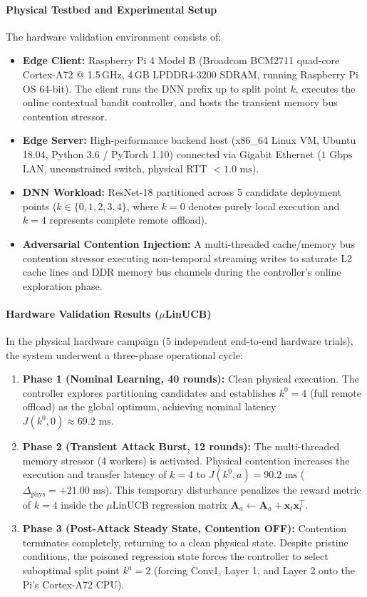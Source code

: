 \paragraph{Physical Testbed and Experimental Setup}
The hardware validation environment consists of:
\begin{itemize}
    \item \textbf{Edge Client:} Raspberry Pi 4 Model B (Broadcom BCM2711 quad-core Cortex-A72 @ 1.5\,GHz, 4\,GB LPDDR4-3200 SDRAM, running Raspberry Pi OS 64-bit). The client runs the DNN prefix up to split point $k$, executes the online contextual bandit controller, and hosts the transient memory bus contention stressor.
    \item \textbf{Edge Server:} High-performance backend host (x86\_64 Linux VM, Ubuntu 18.04, Python 3.6 / PyTorch 1.10) connected via Gigabit Ethernet ($1\text{ Gbps}$ LAN, unconstrained switch, physical RTT $<1.0\text{ ms}$).
    \item \textbf{DNN Workload:} ResNet-18 partitioned across 5 candidate deployment points ($k \in \{0, 1, 2, 3, 4\}$, where $k=0$ denotes purely local execution and $k=4$ represents complete remote offload).
    \item \textbf{Adversarial Contention Injection:} A multi-threaded cache/memory bus contention stressor executing non-temporal streaming writes to saturate L2 cache lines and DDR memory bus channels during the controller's online exploration phase.
\end{itemize}

\paragraph{Hardware Validation Results ($\mu$LinUCB)}
In the physical hardware campaign (5 independent end-to-end hardware trials), the system underwent a three-phase operational cycle:
\begin{enumerate}
    \item \textbf{Phase 1 (Nominal Learning, 40 rounds):} Clean physical execution. The controller explores partitioning candidates and establishes $k^0 = 4$ (full remote offload) as the global optimum, achieving nominal latency $J(k^0, 0) \approx 69.2\text{ ms}$.
    \item \textbf{Phase 2 (Transient Attack Burst, 12 rounds):} The multi-threaded memory stressor (4 workers) is activated. Physical contention increases the execution and transfer latency of $k=4$ to $J(k^0, a) = 90.2\text{ ms}$ ($\Delta_{\text{phys}} = +21.00\text{ ms}$). This temporary disturbance penalizes the reward metric of $k=4$ inside the $\mu$LinUCB regression matrix $\mathbf{A}_a \leftarrow \mathbf{A}_a + \mathbf{x}_t \mathbf{x}_t^\top$.
    \item \textbf{Phase 3 (Post-Attack Steady State, Contention OFF):} Contention terminates completely, returning to a clean physical state. Despite pristine conditions, the poisoned regression state forces the controller to select suboptimal split point $k^a = 2$ (forcing Conv1, Layer 1, and Layer 2 onto the Pi's Cortex-A72 CPU).
\end{enumerate}

